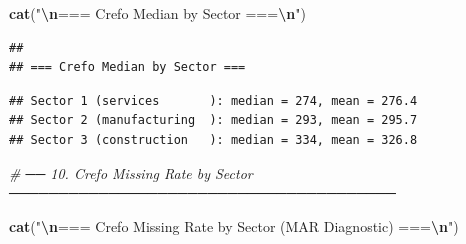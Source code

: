 \documentclass[
]{article}
\newenvironment{Shaded}{\begin{snugshade}}{\end{snugshade}}
\newcommand{\CommentTok}[1]{\textcolor[rgb]{0.56,0.35,0.01}{\textit{#1}}}
\newcommand{\ControlFlowTok}[1]{\textcolor[rgb]{0.13,0.29,0.53}{\textbf{#1}}}
\newcommand{\DecValTok}[1]{\textcolor[rgb]{0.00,0.00,0.81}{#1}}
\newcommand{\FunctionTok}[1]{\textcolor[rgb]{0.13,0.29,0.53}{\textbf{#1}}}
\newcommand{\NormalTok}[1]{#1}
\newcommand{\OtherTok}[1]{\textcolor[rgb]{0.56,0.35,0.01}{#1}}
\newcommand{\SpecialCharTok}[1]{\textcolor[rgb]{0.81,0.36,0.00}{\textbf{#1}}}
\newcommand{\StringTok}[1]{\textcolor[rgb]{0.31,0.60,0.02}{#1}}
\begin{document}
\begin{Shaded}
\begin{Highlighting}[]
\FunctionTok{cat}\NormalTok{(}\StringTok{"}\SpecialCharTok{\textbackslash{}n}\StringTok{=== Crefo Median by Sector ===}\SpecialCharTok{\textbackslash{}n}\StringTok{"}\NormalTok{)}
\end{Highlighting}
\end{Shaded}

\begin{verbatim}
## 
## === Crefo Median by Sector ===
\end{verbatim}

\begin{Shaded}
\end{Shaded}

\begin{verbatim}
## Sector 1 (services       ): median = 274, mean = 276.4
## Sector 2 (manufacturing  ): median = 293, mean = 295.7
## Sector 3 (construction   ): median = 334, mean = 326.8
\end{verbatim}

\begin{Shaded}
\begin{Highlighting}[]
\CommentTok{\# ── 10. Crefo Missing Rate by Sector ───────────────────────────────────────}

\FunctionTok{cat}\NormalTok{(}\StringTok{"}\SpecialCharTok{\textbackslash{}n}\StringTok{=== Crefo Missing Rate by Sector (MAR Diagnostic) ===}\SpecialCharTok{\textbackslash{}n}\StringTok{"}\NormalTok{)}
\end{Highlighting}
\end{Shaded}
\end{document}
